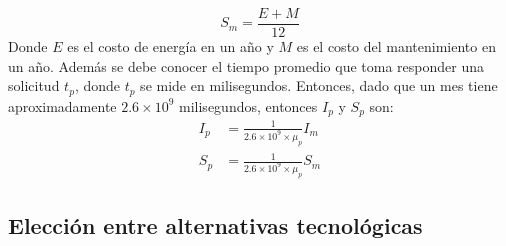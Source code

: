\documentclass[a4paper, 12pt, oneside]{article}
\begin{document}
\[S_m=\frac{E+M}{12}\]
Donde $E$ es el costo de energía en un año y $M$ es el costo del mantenimiento en un año. Además se debe conocer el tiempo promedio que toma responder una solicitud $t_p$, donde $t_p$ se mide en milisegundos. Entonces, dado que un mes tiene aproximadamente $2.6 \times 10^9$ milisegundos, entonces $I_p$ y $S_p$ son:
	\begin{align}
		I_p &= \frac{1}{2.6 \times 10^9 \times \mu_p}I_m \\
		S_p &= \frac{1}{2.6 \times 10^9 \times \mu_p}S_m
	\end{align}

	\subsection{Elección entre alternativas tecnológicas}
	
\end{document}
